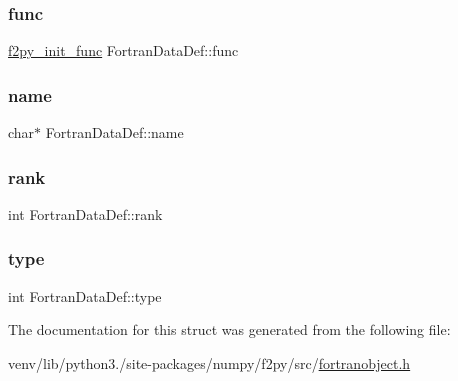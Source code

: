 \mbox{\label{structFortranDataDef_a660c9e10cf3051d67216f583c5978760}} 
\subsubsection{\texorpdfstring{func}{func}}
{\footnotesize\ttfamily \hyperlink{fortranobject_8h_a4203d7c36757a4bec0b9fd5503e6af56}{f2py\+\_\+init\+\_\+func} Fortran\+Data\+Def\+::func}

\mbox{\label{structFortranDataDef_a92f20a73720f0cd46d9c062ecddb226c}} 
\subsubsection{\texorpdfstring{name}{name}}
{\footnotesize\ttfamily char$\ast$ Fortran\+Data\+Def\+::name}

\mbox{\label{structFortranDataDef_a5058ec159b7749be16aed072fd747512}} 
\subsubsection{\texorpdfstring{rank}{rank}}
{\footnotesize\ttfamily int Fortran\+Data\+Def\+::rank}

\mbox{\label{structFortranDataDef_af8064eaf55b569cc849e1b77f1e34abd}} 
\subsubsection{\texorpdfstring{type}{type}}
{\footnotesize\ttfamily int Fortran\+Data\+Def\+::type}



The documentation for this struct was generated from the following file\+:\begin{DoxyCompactItemize}
\item 
venv/lib/python3./site-\/packages/numpy/f2py/src/\hyperlink{fortranobject_8h}{fortranobject.\+h}\end{DoxyCompactItemize}
